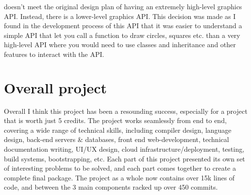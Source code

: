 \trys{} doesn't meet the original design plan of having an extremely high-level graphics API. Instead, there is a lower-level graphics API. This decision was made as I found in the development process of this API that it was easier to understand a simple API that let you call a function to draw circles, squares etc. than a very high-level API where you would need to use classes and inheritance and other features to interact with the API.

\section{Overall project}

Overall I think this project has been a resounding success, especially for a project that is worth just 5 credits. The project works seamlessly from end to end, covering a wide range of technical skills, including compiler design, language design, back-end servers \& databases, front end web-development, technical documentation writing, UI/UX design, cloud infrastructure/deployment, testing, build systems, bootstrapping, etc. Each part of this project presented its own set of interesting problems to be solved, and each part comes together to create a complete final package. The project as a whole now contains over 15k lines of code, and between the 3 main components racked up over 450 commits.
